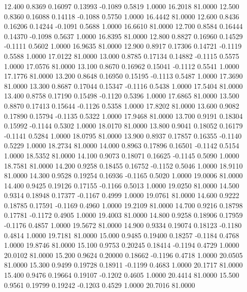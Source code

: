   12.400   0.8369   0.16097   0.13993  -0.1089   0.5819   1.0000  16.2018  81.0000
  12.500   0.8360   0.16088   0.14118  -0.1088   0.5750   1.0000  16.4442  81.0000
  12.600   0.8436   0.16206   0.14244  -0.1091   0.5688   1.0000  16.6610  81.0000
  12.700   0.8584   0.16444   0.14370  -0.1098   0.5637   1.0000  16.8395  81.0000
  12.800   0.8827   0.16960   0.14529  -0.1111   0.5602   1.0000  16.9635  81.0000
  12.900   0.8917   0.17306   0.14721  -0.1119   0.5588   1.0000  17.0122  81.0000
  13.000   0.8785   0.17134   0.14882  -0.1115   0.5575   1.0000  17.0576  81.0000
  13.100   0.8670   0.16962   0.15041  -0.1112   0.5541   1.0000  17.1776  81.0000
  13.200   0.8648   0.16950   0.15195  -0.1113   0.5487   1.0000  17.3690  81.0000
  13.300   0.8687   0.17044   0.15347  -0.1116   0.5438   1.0000  17.5404  81.0000
  13.400   0.8758   0.17190   0.15498  -0.1120   0.5396   1.0000  17.6865  81.0000
  13.500   0.8870   0.17413   0.15644  -0.1126   0.5358   1.0000  17.8202  81.0000
  13.600   0.9082   0.17890   0.15794  -0.1135   0.5322   1.0000  17.9468  81.0000
  13.700   0.9191   0.18304   0.15992  -0.1144   0.5302   1.0000  18.0170  81.0000
  13.800   0.9041   0.18052   0.16179  -0.1141   0.5284   1.0000  18.0795  81.0000
  13.900   0.8937   0.17857   0.16355  -0.1140   0.5229   1.0000  18.2734  81.0000
  14.000   0.8963   0.17896   0.16501  -0.1142   0.5154   1.0000  18.5352  81.0000
  14.100   0.9073   0.18071   0.16625  -0.1145   0.5090   1.0000  18.7581  81.0000
  14.200   0.9258   0.18455   0.16752  -0.1152   0.5046   1.0000  18.9110  81.0000
  14.300   0.9528   0.19254   0.16936  -0.1165   0.5020   1.0000  19.0006  81.0000
  14.400   0.9425   0.19126   0.17155  -0.1166   0.5013   1.0000  19.0250  81.0000
  14.500   0.9314   0.18948   0.17377  -0.1167   0.4999   1.0000  19.0761  81.0000
  14.600   0.9222   0.18785   0.17591  -0.1169   0.4960   1.0000  19.2109  81.0000
  14.700   0.9216   0.18798   0.17781  -0.1172   0.4905   1.0000  19.4003  81.0000
  14.800   0.9258   0.18906   0.17959  -0.1176   0.4857   1.0000  19.5672  81.0000
  14.900   0.9334   0.19074   0.18123  -0.1180   0.4814   1.0000  19.7181  81.0000
  15.000   0.9485   0.19400   0.18257  -0.1184   0.4768   1.0000  19.8746  81.0000
  15.100   0.9753   0.20245   0.18414  -0.1194   0.4729   1.0000  20.0102  81.0000
  15.200   0.9624   0.20000   0.18662  -0.1196   0.4718   1.0000  20.0505  81.0000
  15.300   0.9499   0.19728   0.18911  -0.1199   0.4683   1.0000  20.1717  81.0000
  15.400   0.9476   0.19664   0.19107  -0.1202   0.4605   1.0000  20.4414  81.0000
  15.500   0.9561   0.19799   0.19242  -0.1203   0.4529   1.0000  20.7016  81.0000
